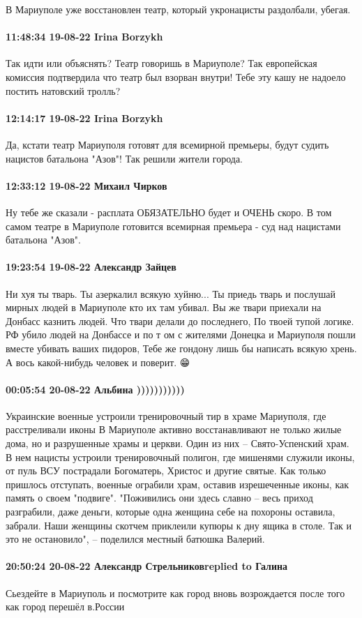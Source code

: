 В Мариуполе уже восстановлен театр, который укронацисты раздолбали, убегая.

\paragraph{11:48:34 19-08-22 Irina Borzykh}

Так идти или объяснять? Театр говоришь в Мариуполе? Так европейская комиссия
подтвердила что театр был взорван внутри! Тебе эту кашу не надоело постить
натовский тролль?

\paragraph{12:14:17 19-08-22 Irina Borzykh}

Да, кстати театр Мариуполя готовят для всемирной премьеры, будут судить
нацистов батальона "Азов"! Так решили жители города.

\paragraph{12:33:12 19-08-22 Михаил Чирков}

Ну тебе же сказали - расплата ОБЯЗАТЕЛЬНО будет и ОЧЕНЬ скоро.  В том самом
театре в Мариуполе готовится всемирная премьера - суд над нацистами батальона
"Азов".

\paragraph{19:23:54 19-08-22 Александр Зайцев}

Ни хуя ты тварь. Ты азеркалил всякую хуйню... Ты приедь тварь и послушай мирных
людей в Мариуполе кто их там убивал. Вы же твари приехали на Донбасс казнить
людей. Что твари делали до последнего, По твоей тупой логике. РФ убило людей на
Донбассе и по т ом с жителями Донецка и Мариуполя пошли вместе убивать ваших
пидоров, Тебе же гондону лишь бы написать всякую хрень. А вось какой-нибудь
человек и поверит. 😁

\paragraph{00:05:54 20-08-22 Альбина )))))))))))}

Украинские военные устроили тренировочный тир в храме Мариуполя, где расстреливали иконы
В Мариуполе активно восстанавливают не только жилые дома, но и разрушенные храмы и церкви. Один из них – Свято-Успенский храм.
В нем нацисты устроили тренировочный полигон, где мишенями служили иконы, от пуль ВСУ пострадали Богоматерь, Христос и другие святые.
Как только пришлось отступать, военные ограбили храм, оставив изрешеченные иконы, как память о своем "подвиге".
"Поживились они здесь славно – весь приход разграбили, даже деньги, которые одна женщина себе на похороны оставила, забрали. Наши женщины скотчем приклеили купюры к дну ящика в столе. Так и это не остановило", – поделился местный батюшка Валерий.

\paragraph{20:50:24 20-08-22 Александр Стрельниковreplied to Галина}

Сьездейте в Мариуполь и посмотрите как город вновь возрождается после того как
город перешёл в.России
